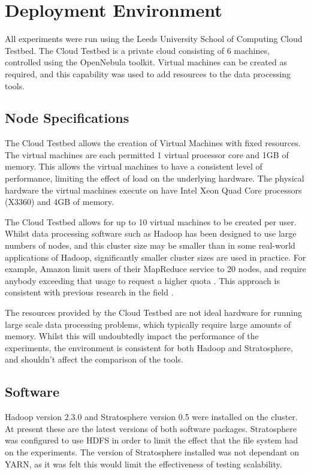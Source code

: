 \section{Deployment Environment}
All experiments were run using the Leeds University School of Computing Cloud Testbed. The Cloud Testbed is a private cloud consisting of 6 machines, controlled using the OpenNebula toolkit. Virtual machines can be created as required, and this capability was used to add resources to the data processing tools. 

\subsection{Node Specifications}
The Cloud Testbed allows the creation of Virtual Machines with fixed resources. The virtual machines are each permitted 1 virtual processor core and 1GB of memory. This allows the virtual machines to have a consistent level of performance, limiting the effect of load on the underlying hardware. The physical hardware the virtual machines execute on have Intel Xeon Quad Core processors (X3360) and 4GB of memory.

The Cloud Testbed allows for up to 10 virtual machines to be created per user. Whilst data processing software such as Hadoop has been designed to use large numbers of nodes, and this cluster size may be smaller than in some real-world applications of Hadoop, significantly smaller cluster sizes are used in practice. For example, Amazon limit users of their MapReduce service to 20 nodes, and require anybody exceeding that usage to request a higher quota \cite{emrlimits}. This approach is consistent with previous research in the field \cite{warneke2011exploiting}.

The resources provided by the Cloud Testbed are not ideal hardware for running large scale data processing problems, which typically require large amounts of memory. Whilst this will undoubtedly impact the performance of the experiments, the environment is consistent for both Hadoop and Stratosphere, and shouldn't affect the comparison of the tools.

\subsection{Software}
Hadoop version 2.3.0 and Stratosphere version 0.5 were installed on the cluster. At present these are the latest versions of both software packages. Stratosphere was configured to use HDFS in order to limit the effect that the file system had on the experiments. The version of Stratosphere installed was not dependant on YARN, as it was felt this would limit the effectiveness of testing scalability.

